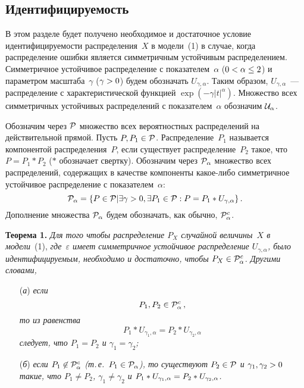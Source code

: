 \begin{multicols}{2}
\section{Идентифицируемость}

В этом разделе будет получено необходимое и достаточное условие
идентифицируемости распределения~$X$ в модели~(1) в случае, когда
распределение ошибки является симметричным устойчивым распределением.
Симметричное устойчивое распределение с показателем~$\alpha$ ($0\hm<\alpha\hm\le2$)
и параметром масштаба~$\gamma$ ($\gamma\hm>0$) будем обозначать
$U_{\gamma,\alpha}$. Таким образом, $U_{\gamma,\alpha}$~--- распределение
с характеристической функцией $\exp(-\gamma|t|^\alpha)$. Множество
всех симметричных устойчивых распределений с показателем~$\alpha$
обозначим ${\cal U}_\alpha$.

Обозначим через ${\cal P}$ множество всех вероятностных распределений на
действительной прямой.
Пусть $P,P_1\in{\cal P}$. Распределение~$P_1$ называется компонентой
распределения~$P$, если существует распределение~$P_2$ такое, что
$P=P_1\ast P_2$ ($\ast$ обозначает свертку). Обозначим через 
${\cal P}_\alpha$ множество всех распределений,
содержащих в качестве компоненты ка\-кое-ли\-бо симметричное устойчивое
распределение с показателем~$\alpha$:
$$
{\cal P}_\alpha=\{P\in{\cal P}|\exists \gamma>0,\exists P_1\in{\cal P}:
P=P_1\ast U_{\gamma,\alpha}\}\,.
$$
Дополнение множества ${\cal P}_\alpha$ будем обозначать, как обычно,
${\cal P}_\alpha^c$.

\smallskip

\noindent
\textbf{Теорема 1.} \textit{Для того чтобы распределение $P_X$ случайной величины~$X$ 
в модели}~(1), \textit{где~$\varepsilon$ имеет сим\-мет\-рич\-ное устойчивое распределение
$U_{\gamma,\alpha}$, было идентифицируемым, необходимо и достаточно, чтобы
$P_X\in{\cal P}_\alpha^c$. Другими словами,}
\begin{itemize}
\item[(\textit{а})] \textit{если
\begin{equation}
P_1,P_2\in{\cal P}_\alpha^c\,,\label{e2-us}
\end{equation}
то из равенства
\begin{equation}
P_1\ast U_{\gamma_1,\alpha}=P_2\ast U_{\gamma_2,\alpha}\label{e3-us}
\end{equation}
следует, что $P_1=P_2$ и $\gamma_1=\gamma_2$;}
\item[(\textit{б})] \textit{если $P_1\not\in{\cal P}_\alpha^c$ (т.\,е.\ $P_1\hm\in{\cal
P}_\alpha$), то существуют $P_2\hm\in{\cal P}$ и $\gamma_1,\gamma_2\hm>0$
такие, что $P_1\not=P_2$, $\gamma_1\not=\gamma_2$ и $P_1\ast
U_{\gamma_1,\alpha}\hm=P_2\ast U_{\gamma_2,\alpha}$.}
\end{itemize}


\end{multicols}
